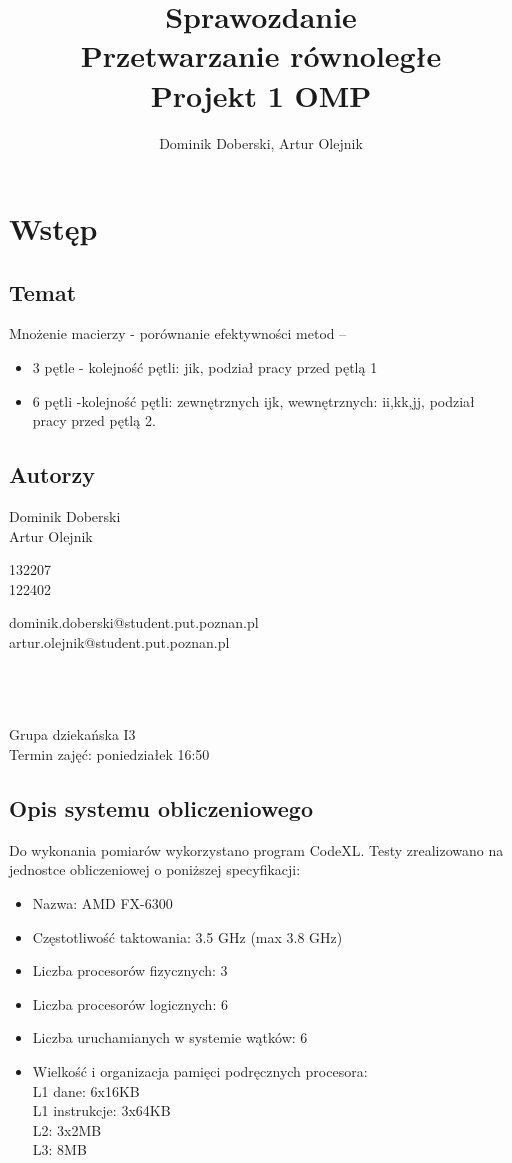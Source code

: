 \documentclass{article}
\author{Dominik Doberski, Artur Olejnik}
\title{
\huge Sprawozdanie 
\\Przetwarzanie równoległe\\
\Huge Projekt 1 OMP}
\begin{document}
\maketitle

\section{Wstęp}
\subsection{Temat}
Mnożenie macierzy - porównanie efektywności metod --
\begin{itemize}
\item 3 pętle - kolejność pętli: jik, podział pracy przed pętlą 1
\item 6 pętli -kolejność pętli: zewnętrznych ijk, wewnętrznych: ii,kk,jj, podział pracy przed pętlą 2.
\end{itemize}
\subsection{Autorzy}
\begin{minipage}[t]{0.3\textwidth}
Dominik Doberski\\
Artur Olejnik
\end{minipage}
\begin{minipage}[t]{0.15\textwidth}
132207\\
122402
\end{minipage}
\begin{minipage}[t]{0.55\textwidth}
dominik.doberski@student.put.poznan.pl\\
artur.olejnik@student.put.poznan.pl
\end{minipage}
\\\\\\
Grupa dziekańska I3\\
Termin zajęć: poniedziałek 16:50 
\subsection{Opis systemu obliczeniowego}
Do wykonania pomiarów wykorzystano program CodeXL. Testy zrealizowano na jednostce obliczeniowej o poniższej specyfikacji:
\begin{itemize}
\item Nazwa: AMD FX-6300
\item Częstotliwość taktowania: 3.5 GHz (max 3.8 GHz)
\item Liczba procesorów fizycznych: 3
\item Liczba procesorów logicznych: 6
\item Liczba uruchamianych w systemie wątków: 6
\item Wielkość i organizacja pamięci podręcznych procesora:\\
L1 dane: 6x16KB\\
L1 instrukcje: 3x64KB\\
L2: 3x2MB\\
L3: 8MB\\
\end{itemize}
\end{document}
